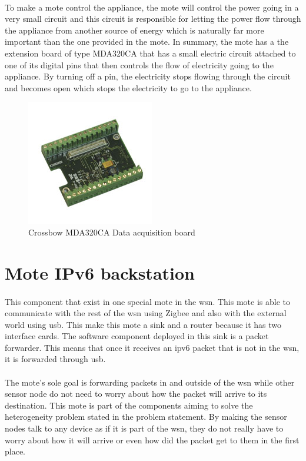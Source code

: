 \documentclass[oneside,12pt,a4paper,final]{book}
\begin{document}
\paragraph{}
To make a mote control the appliance, the mote will control the power going in a very small circuit and this circuit is responsible for letting the power flow through the appliance from another source of energy which is naturally far more important than the one provided in the mote. In summary, the mote has a the extension board of type MDA320CA that has a small electric circuit attached to one of its digital pins that then controls the flow of electricity going to the appliance. By turning off a pin, the electricity stops flowing through the circuit and becomes open which stops the electricity to go to the appliance. 

\begin{figure}[htbp]
\centering
\includegraphics[scale=0.8]{img/mda320.jpg}
\caption{Crossbow MDA320CA Data acquisition board}
\label{fig:mda320ca}
\end{figure}

\section{Mote IPv6 backstation}
\paragraph{} 
This component that exist in one special mote in the \gls{wsn}. This mote is able to communicate with the rest of the \gls{wsn} using Zigbee and also with the external world using \gls{usb}. This make this mote a sink and a router because it has two interface cards. The software component deployed in this sink is a packet forwarder. This means that once it receives an \gls{ipv6} packet that is not in the \gls{wsn}, it is forwarded through \gls{usb}.
\paragraph{}
The mote's sole goal is forwarding packets in and outside of the \gls{wsn} while other sensor node do not need to worry about how the packet will arrive to its destination. This mote is part of the components aiming to solve the heterogeneity problem stated in the problem statement. By making the sensor nodes talk to any device as if it is part of the \gls{wsn}, they do not really have to worry about how it will arrive or even how did the packet get to them in the first place.
\end{document}
